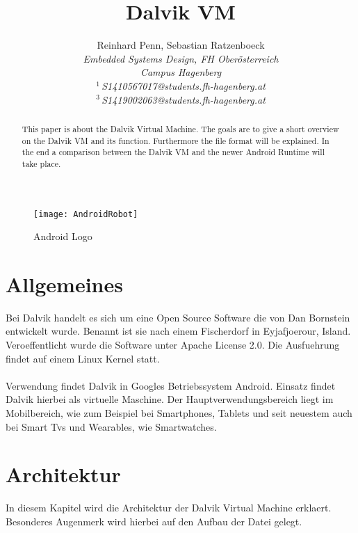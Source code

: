 \documentclass[11pt,conference,a4paper]{IEEEtran}
\title{Dalvik VM}
\author{%
{Reinhard Penn, Sebastian Ratzenboeck}%
\vspace{1.6mm}\\
\fontsize{10}{10}\selectfont\itshape
Embedded Systems Design, FH Oberösterreich\\
Campus Hagenberg\\
\fontsize{9}{9}\selectfont\ttfamily\upshape
%
$^{1}$\,S1410567017@students.fh-hagenberg.at\\
$^{3}$\,S1419002063@students.fh-hagenberg.at%
\vspace{1.2mm}\\
}
\begin{document}
\maketitle
%
\begin{abstract}
This paper is about the Dalvik Virtual Machine. The goals are to give a short overview on the Dalvik VM and its function. Furthermore the  file format will be explained. In the end a comparison between the Dalvik VM and the newer Android Runtime will take place.
\end{abstract}

%
\begin{figure}
\centering
\texttt{[image: AndroidRobot]}
\caption{Android Logo\cite{6}}
\label{fig:AndroidRobot}
\end{figure}

\section{Allgemeines\cite{3}}
Bei Dalvik handelt es sich um eine Open Source Software die von Dan Bornstein entwickelt wurde. Benannt ist sie nach einem Fischerdorf in Eyjafjoerour, Island. Veroeffentlicht wurde die Software unter Apache License 2.0. Die Ausfuehrung findet auf einem Linux Kernel statt.
\\
\\
Verwendung findet Dalvik in Googles Betriebssystem Android. Einsatz findet Dalvik hierbei als virtuelle Maschine. Der Hauptverwendungsbereich liegt im Mobilbereich, wie zum Beispiel bei Smartphones, Tablets und seit neuestem auch bei Smart Tvs und Wearables, wie Smartwatches.


\section{Architektur\cite{2}}
In diesem Kapitel wird die Architektur der Dalvik Virtual Machine erklaert. Besonderes Augenmerk wird hierbei auf den Aufbau der  Datei gelegt.
\end{document}
